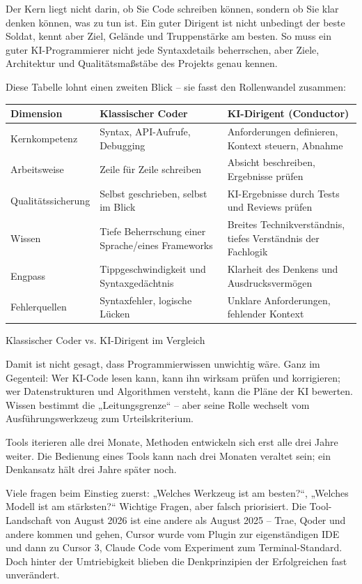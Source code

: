 Der Kern liegt nicht darin, ob Sie Code schreiben können, sondern ob Sie klar denken können, was zu tun ist. Ein guter Dirigent ist nicht unbedingt der beste Soldat, kennt aber Ziel, Gelände und Truppenstärke am besten. So muss ein guter KI-Programmierer nicht jede Syntaxdetails beherrschen, aber Ziele, Architektur und Qualitätsmaßstäbe des Projekts genau kennen.

Diese Tabelle lohnt einen zweiten Blick – sie fasst den Rollenwandel zusammen:

\begin{center}
\begin{tabularx}{\linewidth}{|X|X|X|}
\hline
\textbf{Dimension} & \textbf{Klassischer Coder} & \textbf{KI-Dirigent (Conductor)} \tabularnewline
\hline
Kernkompetenz & Syntax, API-Aufrufe, Debugging & Anforderungen definieren, Kontext steuern, Abnahme \tabularnewline
Arbeitsweise & Zeile für Zeile schreiben & Absicht beschreiben, Ergebnisse prüfen \tabularnewline
Qualitätssicherung & Selbst geschrieben, selbst im Blick & KI-Ergebnisse durch Tests und Reviews prüfen \tabularnewline
Wissen & Tiefe Beherrschung einer Sprache/eines Frameworks & Breites Technikverständnis, tiefes Verständnis der Fachlogik \tabularnewline
Engpass & Tippgeschwindigkeit und Syntaxgedächtnis & Klarheit des Denkens und Ausdrucksvermögen \tabularnewline
Fehlerquellen & Syntaxfehler, logische Lücken & Unklare Anforderungen, fehlender Kontext \tabularnewline
\hline
\end{tabularx}
\end{center}

\begin{center}\small\color{gray}Klassischer Coder vs. KI-Dirigent im Vergleich\end{center}

Damit ist nicht gesagt, dass Programmierwissen unwichtig wäre. Ganz im Gegenteil: Wer KI-Code lesen kann, kann ihn wirksam prüfen und korrigieren; wer Datenstrukturen und Algorithmen versteht, kann die Pläne der KI bewerten. Wissen bestimmt die „Leitungsgrenze“ – aber seine Rolle wechselt vom Ausführungswerkzeug zum Urteilskriterium.


Tools iterieren alle drei Monate, Methoden entwickeln sich erst alle drei Jahre weiter. Die Bedienung eines Tools kann nach drei Monaten veraltet sein; ein Denkansatz hält drei Jahre später noch.

Viele fragen beim Einstieg zuerst: „Welches Werkzeug ist am besten?“, „Welches Modell ist am stärksten?“ Wichtige Fragen, aber falsch priorisiert. Die Tool-Landschaft von August 2026 ist eine andere als August 2025 – Trae, Qoder und andere kommen und gehen, Cursor wurde vom Plugin zur eigenständigen IDE und dann zu Cursor 3, Claude Code vom Experiment zum Terminal-Standard. Doch hinter der Umtriebigkeit blieben die Denkprinzipien der Erfolgreichen fast unverändert.


